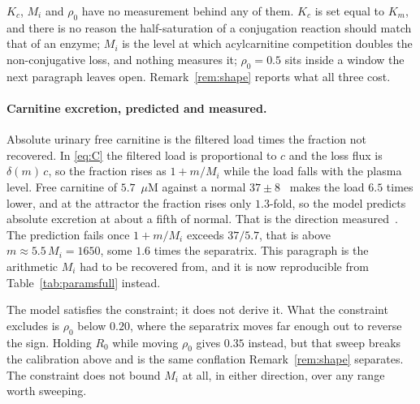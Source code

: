 $K_c$, $M_i$ and $\rho_0$ have no measurement behind any of them. $K_c$ is set equal to
$K_m$, and there is no reason the half-saturation of a conjugation reaction should match that
of an enzyme; $M_i$ is the level at which acylcarnitine competition doubles the
non-conjugative loss, and nothing measures it; $\rho_0 = 0.5$ sits inside a window the next
paragraph leaves open. Remark~\ref{rem:shape} reports what all three cost.

\paragraph{Carnitine excretion, predicted and measured.}
Absolute urinary free carnitine is the filtered load times the fraction not recovered. In
\eqref{eq:C} the filtered load is proportional to $c$ and the loss flux is $\delta(m)\,c$,
so the fraction rises as $1 + m/M_i$ while the load falls with the plasma level. Free
carnitine of $5.7$~$\mu$M against a normal $37 \pm 8$~\cite{carnitine_pa_child} %
makes the load $6.5$ times lower, and at the attractor the fraction rises only $1.3$-fold,
so the model predicts absolute excretion at about a fifth of normal. That is the direction
measured~\cite{carnitine_excretion_pa}. %
The prediction fails once $1 + m/M_i$ exceeds $37/5.7$, that is above
$m \approx 5.5\,M_i = 1650$, some $1.6$ times the separatrix. This paragraph is the
arithmetic $M_i$ had to be recovered from, and it is now reproducible from
Table~\ref{tab:paramsfull} instead.

The model satisfies the constraint; it does not derive it. What the constraint excludes is
$\rho_0$ below $0.20$, where the separatrix moves far enough out to reverse the sign. Holding
$R_0$ while moving $\rho_0$ gives $0.35$ instead, but that sweep breaks the calibration
above and is the same conflation Remark~\ref{rem:shape} separates. The constraint does not bound $M_i$ at
all, in either direction, over any range worth sweeping.

